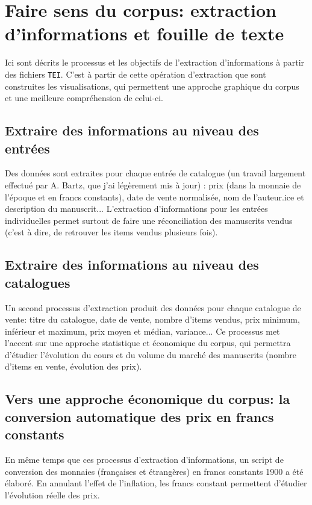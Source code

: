 \documentclass[a4paper, 12pt, twoside]{book}
\newcommand{\tei}{\texttt{TEI}}
\begin{document}
\section{Faire sens du corpus: extraction d'informations et fouille de texte}
Ici sont décrits le processus et les objectifs de l'extraction d'informations à partir des fichiers \tei{}. C'est à partir de cette opération d'extraction que sont construites les visualisations, qui permettent une approche graphique du corpus et une meilleure compréhension de celui-ci.

\subsection{Extraire des informations au niveau des entrées}
Des données sont extraites pour chaque entrée de catalogue (un travail largement effectué par A. Bartz, que j'ai légèrement mis à jour) : prix (dans la monnaie de l'époque et en francs constants), date de vente normalisée, nom de l'auteur.ice et description du manuscrit... L'extraction d'informations pour les entrées individuelles permet surtout de faire une réconciliation des manuscrits vendus (c'est à dire, de retrouver les items vendus plusieurs fois).

\subsection{Extraire des informations au niveau des catalogues}
Un second processus d'extraction produit des données pour chaque catalogue de vente: titre du catalogue, date de vente, nombre d'items vendus, prix minimum, inférieur et maximum, prix moyen et médian, variance... Ce processus met l'accent sur une approche statistique et économique du corpus, qui permettra d'étudier l'évolution du cours et du volume du marché des manuscrits (nombre d'items en vente, évolution des prix).

\subsection{Vers une approche économique du corpus: la conversion automatique des prix en francs constants}
En même temps que ces processus d'extraction d'informations, un script de conversion des monnaies (françaises et étrangères) en francs constants 1900 a été élaboré. En annulant l'effet de l'inflation, les francs constant permettent d'étudier l'évolution réelle des prix.
\end{document}
